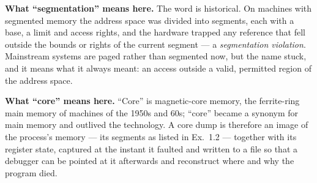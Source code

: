 \textbf{What ``segmentation'' means here.} The word is historical. On machines with
segmented memory the address space was divided into segments, each with a base, a limit
and access rights, and the hardware trapped any reference that fell outside the bounds or
rights of the current segment --- a \emph{segmentation violation}. Mainstream systems are
paged rather than segmented now, but the name stuck, and it means what it always meant:
an access outside a valid, permitted region of the address space.

\textbf{What ``core'' means here.} ``Core'' is magnetic-core memory, the ferrite-ring
main memory of machines of the 1950s and 60s; ``core'' became a synonym for main memory
and outlived the technology. A core dump is therefore an image of the process's memory
--- its segments as listed in Ex.~1.2 --- together with its register state, captured at
the instant it faulted and written to a file so that a debugger can be pointed at it
afterwards and reconstruct where and why the program died.
